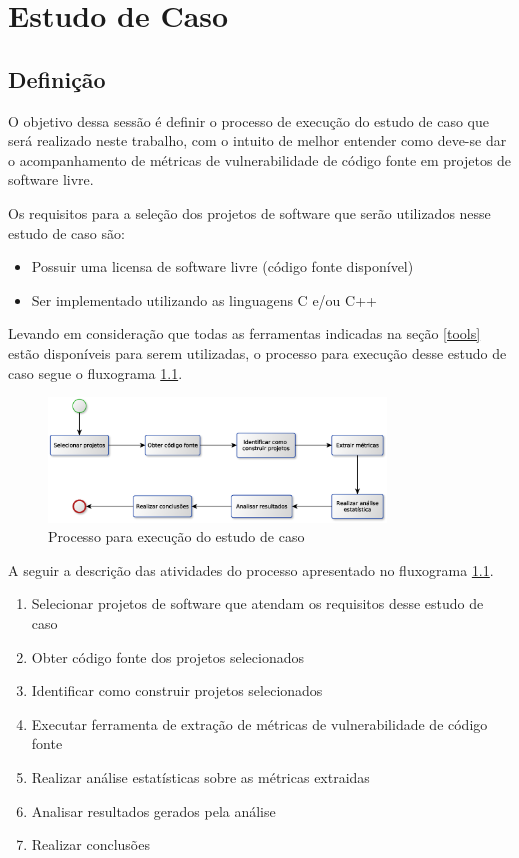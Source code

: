 \chapter{Estudo de Caso} \label{estudodecaso}

\section{Definição} \label{definicao_estudo}

O objetivo dessa sessão é definir o processo de execução do estudo de caso que será realizado neste trabalho, com o intuito 
de melhor entender como deve-se dar o acompanhamento de métricas de vulnerabilidade de código fonte em projetos de software
livre. 

Os requisitos para a seleção dos projetos de software que serão utilizados nesse estudo de caso são:

\begin{itemize}
  \item Possuir uma licensa de software livre (código fonte disponível)
  \item Ser implementado utilizando as linguagens C e/ou C++
\end{itemize}

Levando em consideração que todas as ferramentas indicadas na seção \ref{tools} estão disponíveis para serem utilizadas, o
processo para execução desse estudo de caso segue o fluxograma \ref{processo_estudo_de_caso}.

\begin{figure}[h]
  \centering
  \includegraphics[width=0.8\textwidth]
      {figuras/estudo_de_caso_processo.eps}
  \caption{Processo para execução do estudo de caso}
  \label{processo_estudo_de_caso}
\end{figure}

A seguir a descrição das atividades do processo apresentado no fluxograma \ref{processo_estudo_de_caso}.

\begin{enumerate}\label{desc_processo}
  \item Selecionar projetos de software que atendam os requisitos desse estudo de caso
  \item Obter código fonte dos projetos selecionados
  \item Identificar como construir projetos selecionados 
  \item Executar ferramenta de extração de métricas de vulnerabilidade de código fonte
  \item Realizar análise estatísticas sobre as métricas extraidas
  \item Analisar resultados gerados pela análise
  \item Realizar conclusões
\end{enumerate}

